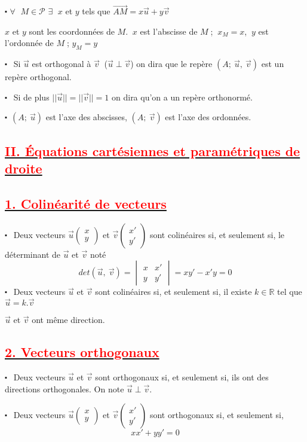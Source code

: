 \documentclass[12pt]{article}
\begin{document}
$\centerdot$ $\forall\;$ $M\in\mathcal{P}$ $\exists\;$ $x$ et $y$ tels que $\overrightarrow{AM}=x\vec{u}+y\vec{v}$

$x$ et $y$ sont les coordonnées de $M$. $\ x$ est l'abscisse de $M\;$; $\ x_{M}=x$, $\ y$ est l'ordonnée de $M\;$; $y_{M}=y$

$\centerdot\ \ $ Si $\vec{u}$ est orthogonal à $\vec{v}\ $ ($\vec{u}\perp\vec{v}$) on dira que le repère $(A;\ \vec{u},\ \vec{v})$ est un repère orthogonal.

$\centerdot\ \ $ Si de plus $||\vec{u}||=||\vec{v}||=1$ on dira qu'on a un repère orthonormé.

$\centerdot\ \ (A;\ \vec{u})$ est l'axe des abscisses, $(A;\ \vec{v})$ est l'axe des ordonnées.
\subsection*{\underline{\textcolor{red}{\textbf{II. Équations cartésiennes et paramétriques de droite}}}}
\subsection*{\underline{\textcolor{red}{\textbf{1. Colinéarité de vecteurs}}}}
$\centerdot\ \ $ Deux vecteurs $\vec{u}\begin{pmatrix}
x\\
y
\end{pmatrix}$ et $\vec{v}\begin{pmatrix}
x'\\
y'
\end{pmatrix}$ sont colinéaires si, et seulement si, le déterminant de $\vec{u}$ et $\vec{v}$ noté $$det(\vec{u},\ \vec{v})=\begin{vmatrix}
x & x'\\
	y & y'
	\end{vmatrix}=xy'-x'y=0$$
	$\centerdot\ \ $ Deux vecteurs $\vec{u}$ et $\vec{v}$ sont colinéaires si, et seulement si, il existe $k\in\mathbb{R}$ tel que $\vec{u}=k.\vec{v}$
	
$\vec{u}$ et $\vec{v}$ ont même direction.
\subsection*{\underline{\textcolor{red}{\textbf{2. Vecteurs orthogonaux}}}}
	$\centerdot\ \ $ Deux vecteurs $\vec{u}$ et $\vec{v}$ sont orthogonaux si, et seulement si, ils ont des directions orthogonales. On note $\vec{u}\perp\vec{v}$.
	
	$\centerdot\ \ $ Deux vecteurs $\vec{u}\begin{pmatrix}
	x\\
	y
	\end{pmatrix}$ et $\vec{v}\begin{pmatrix}
	x'\\
	y'
	\end{pmatrix}$ sont orthogonaux si, et seulement si, $$xx'+yy'=0$$
\end{document}
